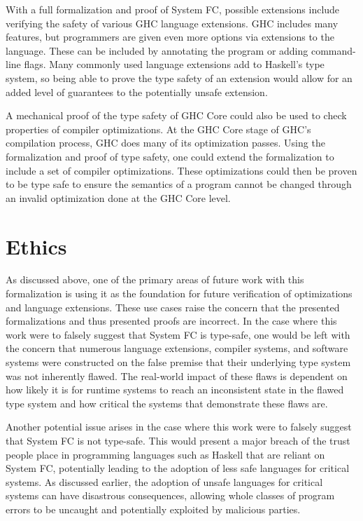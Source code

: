 \documentclass{sig-alternate}
\begin{document}
With a full formalization and proof of System FC, possible extensions include verifying the safety of various GHC language extensions. GHC includes many features, but programmers are given even more options via extensions to the language. These can be included by annotating the program or adding command-line flags. Many commonly used language extensions add to Haskell's type system, so being able to prove the type safety of an extension would allow for an added level of guarantees to the potentially unsafe extension.

A mechanical proof of the type safety of GHC Core could also be used to check properties of compiler optimizations. At the GHC Core stage of GHC's compilation process, GHC does many of its optimization passes. Using the formalization and proof of type safety, one could extend the formalization to include a set of compiler optimizations. These optimizations could then be proven to be type safe to ensure the semantics of a program cannot be changed through an invalid optimization done at the GHC Core level.

\section{Ethics}
\label{sec:ethics}

As discussed above, one of the primary areas of future work with this formalization is using it as the foundation for future verification of optimizations and language extensions. These use cases raise the concern that the presented formalizations and thus presented proofs are incorrect. In the case where this work were to falsely suggest that System FC is type-safe, one would be left with the concern that numerous language extensions, compiler systems, and software systems were constructed on the false premise that their underlying type system was not inherently flawed. The real-world impact of these flaws is dependent on how likely it is for runtime systems to reach an inconsistent state in the flawed type system and how critical the systems that demonstrate these flaws are. 

Another potential issue arises in the case where this work were to falsely suggest that System FC is not type-safe. This would present a major breach of the trust people place in programming languages such as Haskell that are reliant on System FC, potentially leading to the adoption of less safe languages for critical systems. As discussed earlier, the adoption of unsafe languages for critical systems can have disastrous consequences, allowing whole classes of program errors to be uncaught and potentially exploited by malicious parties.
\end{document}
